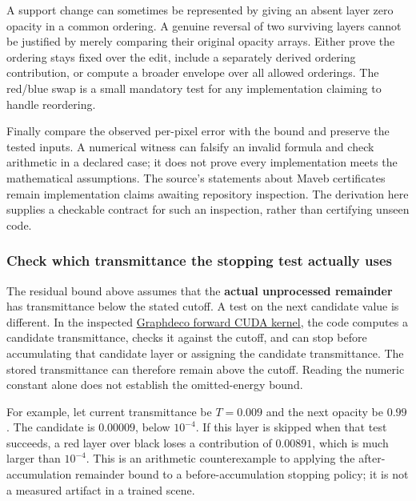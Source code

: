 A support change can sometimes be represented by giving an absent layer zero opacity in a common ordering. A genuine reversal of two surviving layers cannot be justified by merely comparing their original opacity arrays. Either prove the ordering stays fixed over the edit, include a separately derived ordering contribution, or compute a broader envelope over all allowed orderings. The red/blue swap is a small mandatory test for any implementation claiming to handle reordering.

Finally compare the observed per-pixel error with the bound and preserve the tested inputs. A numerical witness can falsify an invalid formula and check arithmetic in a declared case; it does not prove every implementation meets the mathematical assumptions. The source's statements about Maveb certificates remain implementation claims awaiting repository inspection. The derivation here supplies a checkable contract for such an inspection, rather than certifying unseen code.

\subsubsection{Check which transmittance the stopping test actually uses}\label{06-engine-ii-ch045-check-which-transmittance-the-stopping-test-actually-uses}

\hypertarget{06-engine-ii-ch045-check-which-transmittance-the-stopping-test-actually-uses}{}

The residual bound above assumes that the \textbf{actual unprocessed remainder} has transmittance below the stated cutoff. A test on the next candidate value is different. In the inspected \href{https://github.com/graphdeco-inria/diff-gaussian-rasterization/blob/main/cuda_rasterizer/forward.cu}{Graphdeco forward CUDA kernel}, the code computes a candidate transmittance, checks it against the cutoff, and can stop before accumulating that candidate layer or assigning the candidate transmittance. The stored transmittance can therefore remain above the cutoff. Reading the numeric constant alone does not establish the omitted-energy bound.

For example, let current transmittance be \(T=0.009\) and the next opacity be \(0.99\). The candidate is \(0.00009\), below \(10^{-4}\). If this layer is skipped when that test succeeds, a red layer over black loses a contribution of \(0.00891\), which is much larger than \(10^{-4}\). This is an arithmetic counterexample to applying the after-accumulation remainder bound to a before-accumulation stopping policy; it is not a measured artifact in a trained scene.

